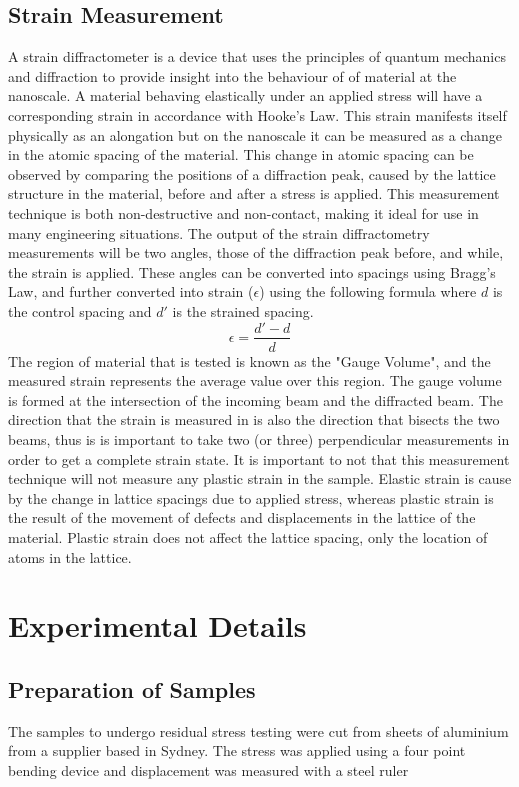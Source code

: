 \documentclass[11pt, oneside]{article}   	%
\begin{document}
\subsection{Strain Measurement}
A strain diffractometer is a device that uses the principles of quantum mechanics and diffraction to provide insight into the behaviour of of material at the nanoscale. A material behaving elastically under an applied stress will have a corresponding strain in accordance with Hooke's Law. This strain manifests itself physically as an alongation but on the nanoscale it can be measured as a change in the atomic spacing of the material. This change in atomic spacing can be observed by comparing the positions of a diffraction peak, caused by the lattice structure in the material, before and after a stress is applied. This measurement technique is both non-destructive and non-contact, making it ideal for use in many engineering situations.
The output of the strain diffractometry measurements will be two angles, those of the diffraction peak before, and while, the strain is applied. These angles can be converted into spacings using Bragg's Law, and further converted into strain ($\epsilon$) using the following formula where $d$ is the control spacing and $d'$ is the strained spacing.
\[
\epsilon = \frac{d'-d}{d}
\]
The region of material that is tested is known as the "Gauge Volume", and the measured strain represents the average value over this region. The gauge volume is formed at the intersection of the incoming beam and the diffracted beam. The direction that the strain is measured in is also the direction that bisects the two beams, thus is is important to take two (or three) perpendicular measurements in order to get a complete strain state.
It is important to not that this measurement technique will not measure any plastic strain in the sample. Elastic strain is cause by the change in lattice spacings due to applied stress, whereas plastic strain is the result of the movement of defects and displacements in the lattice of the material. Plastic strain does not affect the lattice spacing, only the location of atoms in the lattice.
\section{Experimental Details}
\subsection{Preparation of Samples}
The samples to undergo residual stress testing were cut from sheets of aluminium from a supplier based in Sydney. The stress was applied using a four point bending device and displacement was measured with a steel ruler
\end{document}
